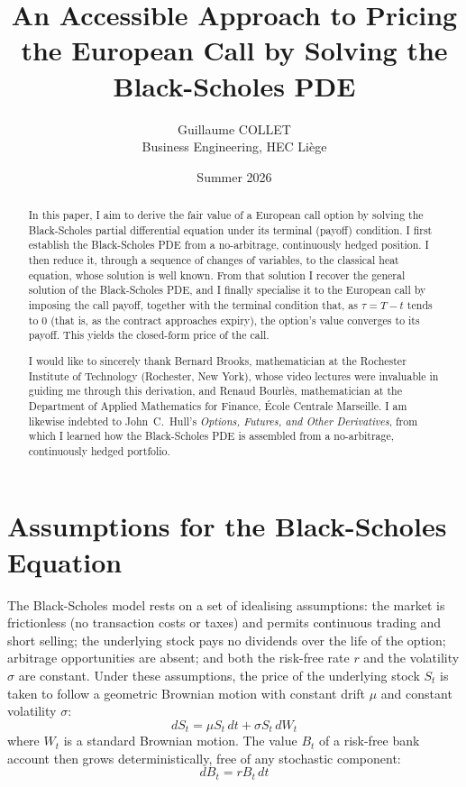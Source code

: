 \documentclass[a4paper,12pt]{article}
\title{An Accessible Approach to Pricing the European Call by Solving the Black-Scholes PDE}
\author{Guillaume COLLET \\ Business Engineering, HEC Li\`ege}
\date{Summer 2026}
\numberwithin{equation}{section}
\begin{document}
\maketitle

\begin{abstract}
In this paper, I aim to derive the fair value of a European call option by
solving the Black-Scholes partial differential equation under its terminal
(payoff) condition. I first establish the Black-Scholes PDE from a no-arbitrage,
continuously hedged position. I then reduce it, through a sequence of changes of
variables, to the classical heat equation, whose solution is well known. From
that solution I recover the general solution of the Black-Scholes PDE, and I
finally specialise it to the European call by imposing the call payoff, together
with the terminal condition that, as $\tau = T - t$ tends to $0$ (that is, as the
contract approaches expiry), the option's value converges to its payoff. This
yields the closed-form price of the call.

I would like to sincerely thank Bernard Brooks, mathematician at the Rochester
Institute of Technology (Rochester, New York), whose video lectures were
invaluable in guiding me through this derivation, and Renaud Bourl\`es,
mathematician at the Department of Applied Mathematics for Finance,
\'{E}cole Centrale Marseille. I am likewise indebted to John~C.\ Hull's
\emph{Options, Futures, and Other Derivatives}, from which I learned how the
Black-Scholes PDE is assembled from a no-arbitrage, continuously hedged portfolio.
\end{abstract}

\section{Assumptions for the Black-Scholes Equation}\label{sec:assumptions}

The Black-Scholes model rests on a set of idealising assumptions: the market is
frictionless (no transaction costs or taxes) and permits continuous trading and
short selling; the underlying stock pays no dividends over the life of the
option; arbitrage opportunities are absent; and both the risk-free rate $r$ and
the volatility $\sigma$ are constant. Under these assumptions, the price of the
underlying stock $S_t$ is taken to follow a geometric Brownian motion with
constant drift $\mu$ and constant volatility $\sigma$:
\begin{equation}\label{eq:gbm}
  dS_t = \mu S_t\,dt + \sigma S_t\,dW_t 
\end{equation}
where $W_t$ is a standard Brownian motion. The value $B_t$ of a risk-free bank
account then grows deterministically, free of any stochastic component:
\begin{equation}\label{eq:bank}
  dB_t = r B_t\,dt 
\end{equation}
\end{document}
